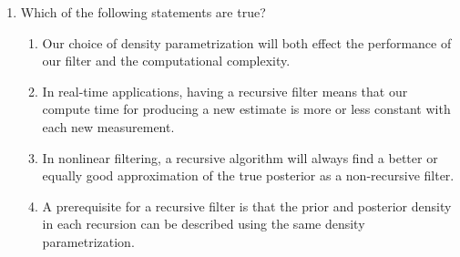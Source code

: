\begin{enumerate}
\item Which of the following statements are true?

\begin{enumerate}
\item Our choice of density parametrization will both effect the performance of our filter and the computational complexity. 
\item In real-time applications, having a recursive filter means that our compute time for producing a new estimate is more or less constant with each new measurement. 
\item In nonlinear filtering, a recursive algorithm will always find a better or equally good approximation of the true posterior as a non-recursive filter. 
\item A prerequisite for a recursive filter is that the prior and posterior density in each recursion can be described using the same density parametrization. 
\end{enumerate}
\end{enumerate}


